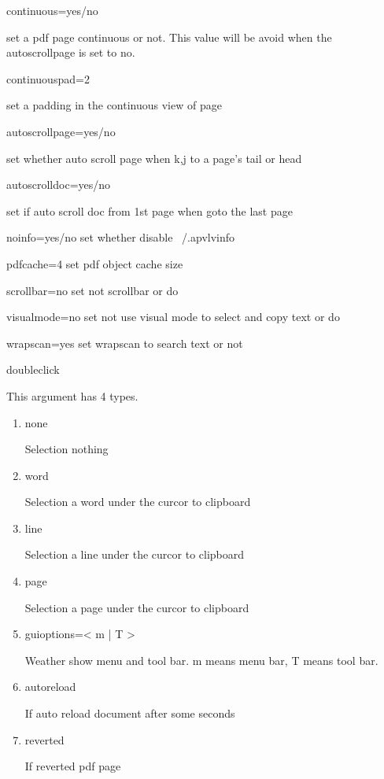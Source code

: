 \documentclass[a4paper,12pt]{article}
\begin{document}
\begin{description}
\item continuous=yes/no

set a pdf page continuous or not. This value will be avoid when the autoscrollpage is set to no.

\item continuouspad=2

set a padding in the continuous view of page

\item autoscrollpage=yes/no

set whether auto scroll page when k,j to a page's tail or head

\item autoscrolldoc=yes/no

set if auto scroll doc from 1st page when goto the last page

\item noinfo=yes/no
set whether disable ~/.apvlvinfo

\item pdfcache=4
set pdf object cache size

\item scrollbar=no
set not scrollbar or do

\item visualmode=no
set not use visual mode to select and copy text or do

\item wrapscan=yes
set wrapscan to search text or not

\item doubleclick

This argument has 4 types.

\begin{enumerate}

\item none

Selection nothing

\item word

Selection a word under the curcor to clipboard

\item line

Selection a line under the curcor to clipboard

\item page

Selection a page under the curcor to clipboard

\item guioptions=< m | T >

Weather show menu and tool bar. m means menu bar, T means tool bar.

\item autoreload

If auto reload document after some seconds

\item reverted

If reverted pdf page

\end{enumerate}

\end{description}
\end{document}
